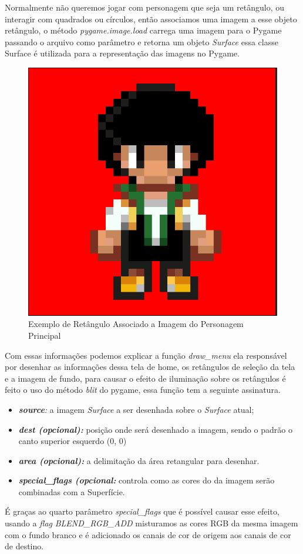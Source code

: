 Normalmente não queremos jogar com personagem que seja um retângulo, ou interagir com quadrados ou círculos, então associamos uma imagem a esse objeto retângulo, o método \textit{pygame.image.load} carrega uma imagem para o Pygame passando o arquivo como parâmetro e retorna um objeto \textit{Surface} essa classe Surface é utilizada para a representação das imagens no Pygame.
\begin{figure}[h!]
    \centering
    \includegraphics[width=0.5\linewidth]{figuras/player.png}
    \caption{Exemplo de Retângulo Associado a Imagem do Personagem Principal}
    \label{fig:player}
\end{figure}

Com essas informações podemos explicar a função \textit{draw\_menu} ela responsável por desenhar as informações dessa tela de home, os retângulos de seleção da tela e a imagem de fundo, para causar o efeito de iluminação sobre os retângulos é feito o uso do método \textit{blit} do pygame, essa função tem a seguinte assinatura.
\begin{itemize}
    \item \textit{\textbf{source}:} a imagem \textit{Surface} a ser desenhada sobre o \textit{Surface} atual;
    \item \textit{\textbf{dest (opcional):}} posição onde será desenhado a imagem, sendo o padrão o canto superior esquerdo (0, 0)
    \item \textit{\textbf{area (opcional):}} a delimitação da área retangular para desenhar.
    \item \textit{\textbf{special\_flags (opcional:}} controla como as cores do da imagem serão combinadas com a Superfície.
\end{itemize}
É graças ao quarto parâmetro \textit{special\_flags} que é possível causar esse efeito, usando a \textit{flag} \textit{BLEND\_RGB\_ADD } misturamos as cores RGB da mesma imagem com o fundo branco e é adicionado os canais de cor de origem aos canais de cor de destino.

